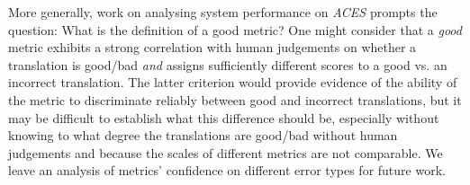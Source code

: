 \documentclass[11pt]{article}
\begin{document}
More generally, work on analysing system performance on \textit{\textsc{ACES}} prompts the question: What is the definition of a good metric? One might consider that a \textit{good} metric exhibits a strong correlation with human judgements on whether a translation is good/bad \textit{and}  assigns sufficiently different scores to a good vs. an incorrect translation. The latter criterion would provide evidence of the ability of the metric to discriminate reliably between good and incorrect translations, but it may be difficult to establish what this difference should be, especially without knowing to what degree the translations are good/bad without human judgements and because the scales of different metrics are not comparable. We leave an analysis of metrics' confidence on different error types for future work. 
\end{document}
